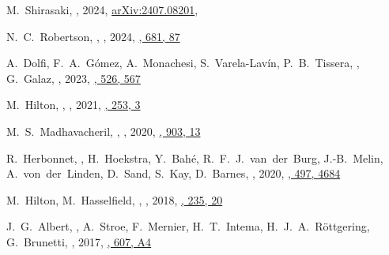 \item
M.~Shirasaki, \myself, 
2024, \href{https://ui.adsabs.harvard.edu/abs/2024arXiv240708201S/abstract}{arXiv:2407.08201},
\submitted{\prd}

\item
N.~C.~Robertson, \myself, 
,
2024, \href{https://ui.adsabs.harvard.edu/abs/2024A&A...681A..87R/abstract}{\aap, 681, 87}

\item
A.~Dolfi, F.~A.~G\'omez, A.~Monachesi, S.~Varela-Lav\'in, P.~B.~Tissera, \myself, G.~Galaz, 
,
2023, \href{https://ui.adsabs.harvard.edu/abs/2023MNRAS.526..567D/abstract}{\mnras, 526, 567}

\item
M.~Hilton, \myself, 
,
2021, \href{https://ui.adsabs.harvard.edu/abs/2021ApJS..253....3H/abstract}{\apjs, 253, 3}

\item
M.~S.~Madhavacheril, \myself, 
,
2020, \href{https://ui.adsabs.harvard.edu/abs/2020ApJ...903L..13M/abstract}{\apjl, 903, 13}

\item
R.~Herbonnet, \myself, H.~Hoekstra, Y.~Bah\'e, R.~F.~J.~van~der~Burg, 
J.-B.~Melin, A.~von~der~Linden, D.~Sand, S.~Kay, D.~Barnes,
,
2020, \href{https://ui.adsabs.harvard.edu/abs/2020MNRAS.497.4684H/abstract}{\mnras, 497, 4684}

\item
M.~Hilton, M.~Hasselfield, \myself, 
,
2018, \href{https://ui.adsabs.harvard.edu/abs/2018ApJS..235...20H}{\apjs, 235, 20}

\item
J.~G.~Albert, \myself, A.~Stroe, F.~Mernier, H.~T.~Intema, H.~J.~A.~R\"ottgering, 
G.~Brunetti,
,
2017, \href{https://ui.adsabs.harvard.edu/abs/2017A&A...607A...4A}{\aap, 607, A4}

